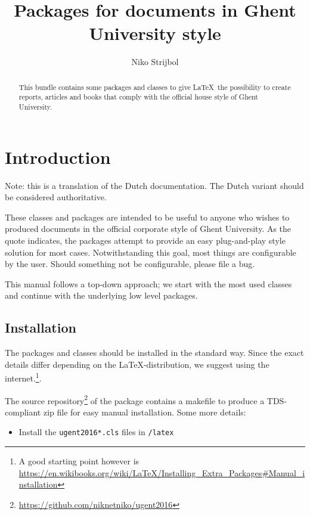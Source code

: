 \documentclass[11pt,parskip=half-]{scrartcl}
\title{Packages for documents in Ghent University style}
\author{Niko Strijbol}
\begin{document}
    \maketitle

    \begin{abstract}
        \noindent This bundle contains some packages and classes to give \LaTeX\ the possibility to create reports, articles and books that comply with the official house style of Ghent University.
    \end{abstract}

    \tableofcontents

    \section{Introduction}\label{sec:introductie}

    Note: this is a translation of the Dutch documentation. The Dutch variant should be considered authoritative.


    These classes and packages are intended to be useful to anyone who wishes to produced documents in the official corporate style of Ghent University. As the quote indicates, the packages attempt to provide an easy plug-and-play style solution for most cases. Notwithstanding this goal, most things are configurable by the user. Should something not be configurable, please file a bug.

    This manual follows a top-down approach; we start with the most used classes and continue with the underlying low level packages.

    \subsection{Installation}\label{subsec:installatie}
    The packages and classes should be installed in the standard way. Since the exact details differ depending on the \LaTeX-distribution, we suggest using the internet.\footnote{A good starting point however is \url{https://en.wikibooks.org/wiki/LaTeX/Installing_Extra_Packages\#Manual_installation}}.

    The source repository\footnote{\url{https://github.com/niknetniko/ugent2016}} of the package contains a makefile to produce a TDS-compliant zip file for easy manual installation. Some more details:
    \begin{itemize}
        \item Install the \texttt{ugent2016*.cls} files in \texttt{/latex}
    \end{itemize}
\end{document}
